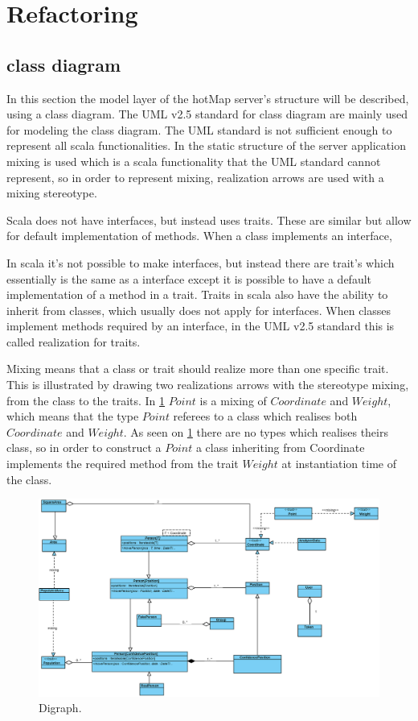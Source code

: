 \section{Refactoring} \label{sec:s4_refactoring}



\subsection{class diagram}

In this section the model layer of the hotMap server's structure will be described, using a class diagram. The UML v2.5 standard for class diagram are mainly used for modeling the class diagram. The UML standard is not sufficient enough to represent all scala functionalities. In the static structure of the server application mixing is used which is a scala functionality that the UML standard cannot represent, so in order to represent mixing, realization arrows are used with a mixing stereotype.

Scala does not have interfaces, but instead uses traits. These are similar but allow for default implementation of methods. When a class implements an interface,  


In scala it's not possible to make interfaces, but instead there are trait's which essentially is the same as a interface except it is possible to have a default implementation of a method in a trait. Traits in scala also have the ability to inherit from classes, which usually does not apply for interfaces. When classes implement methods required by an interface, in the UML v2.5 standard this is called realization for traits.

Mixing means that a class or trait should realize more than one specific trait. This is illustrated by drawing two realizations arrows with the stereotype mixing, from the class to the traits. In \cref{fig:class} $Point$ is a mixing of $Coordinate$ and $Weight$, which means that the type $Point$ referees to a class which realises both $Coordinate$ and $Weight$. As seen on \cref{fig:class} there are no types which realises theirs class, so in order to construct a $Point$ a class inheriting from Coordinate implements the required method from the trait $Weight$ at instantiation time of the class.

\begin{figure}[!htb]
\centering
\includegraphics[scale=.7]{figures/class.eps}
\caption{Digraph.}
\label{fig:class}
\end{figure}